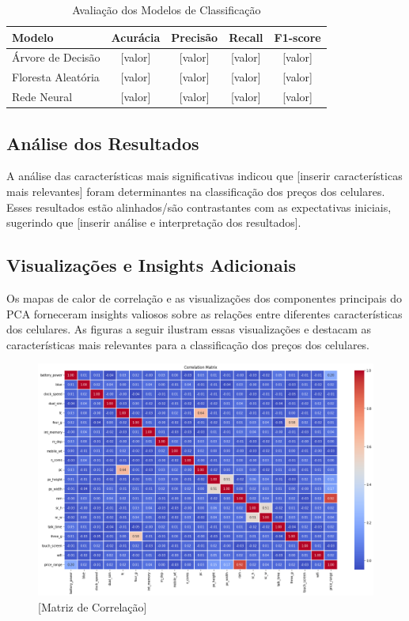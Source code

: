 \documentclass[conference]{IEEEtran}
\begin{document}
\begin{table}[h]
\centering
\caption{Avaliação dos Modelos de Classificação}
\begin{tabular}{|l|c|c|c|c|}
\hline
Modelo & Acurácia & Precisão & Recall & F1-score \\
\hline
Árvore de Decisão & [valor] & [valor] & [valor] & [valor] \\
Floresta Aleatória & [valor] & [valor] & [valor] & [valor] \\
Rede Neural & [valor] & [valor] & [valor] & [valor] \\
\hline
\end{tabular}
\end{table}

\subsection{Análise dos Resultados}

A análise das características mais significativas indicou que [inserir características mais relevantes] foram determinantes na classificação dos preços dos celulares. Esses resultados estão alinhados/são contrastantes com as expectativas iniciais, sugerindo que [inserir análise e interpretação dos resultados].

\subsection{Visualizações e Insights Adicionais}

Os mapas de calor de correlação e as visualizações dos componentes principais do PCA 
forneceram insights valiosos sobre as relações entre diferentes características 
dos celulares. 
As figuras a seguir ilustram essas visualizações e destacam as características
mais relevantes para a classificação dos preços dos celulares.


\begin{figure}[htbp]
    \centerline{\includegraphics[scale=0.2]{matrix_correlation.png}}
    \caption{[Matriz de Correlação]}
    \label{fig:imagem1}
\end{figure}
\end{document}
